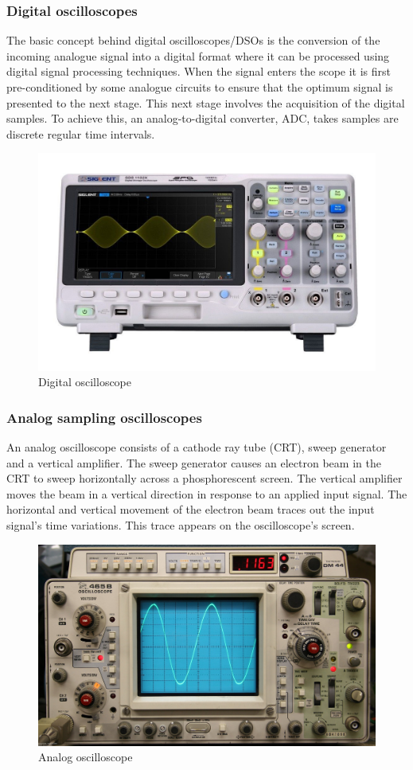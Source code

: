 \documentclass[letterpaper]{article}
\begin{document}
\subsubsection*{Digital oscilloscopes}
The basic concept behind digital oscilloscopes/DSOs is the conversion of the incoming analogue signal into a digital format where it can be processed using digital signal processing techniques.
When the signal enters the scope it is first pre-conditioned by some analogue circuits to ensure that the optimum signal is presented to the next stage.
This next stage involves the acquisition of the digital samples. To achieve this, an analog-to-digital converter, ADC, takes samples are discrete regular time intervals.
\begin{figure}[H]
    \centering
    \includegraphics[width=.4\linewidth]{img/intro/digital_os}
    \caption{Digital oscilloscope}
\end{figure}
\subsubsection*{Analog sampling oscilloscopes}
An analog oscilloscope consists of a cathode ray tube (CRT), sweep generator and a vertical amplifier. The sweep generator causes an electron beam in the CRT to sweep horizontally across a phosphorescent screen. The vertical amplifier moves the beam in a vertical direction in response to an applied input signal. The horizontal and vertical movement of the electron beam traces out the input signal's time variations. This trace appears on the oscilloscope's screen.
\begin{figure}[H]
    \centering
    \includegraphics[width=.4\linewidth]{img/intro/analog_os}
    \caption{Analog oscilloscope}
\end{figure}
\end{document}
